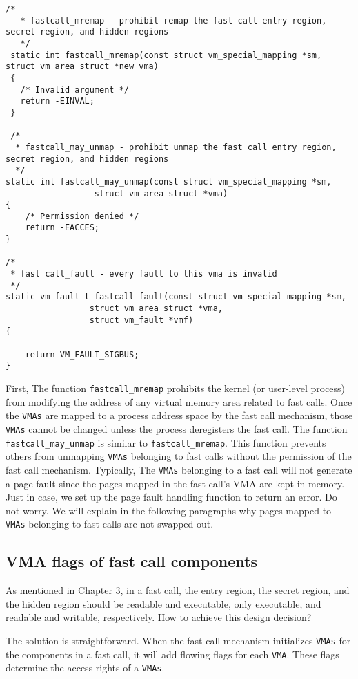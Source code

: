 \begin{lstlisting}[style=CStyle]
  /*
   * fastcall_mremap - prohibit remap the fast call entry region, secret region, and hidden regions
   */
 static int fastcall_mremap(const struct vm_special_mapping *sm, struct vm_area_struct *new_vma)
 {
   /* Invalid argument */
   return -EINVAL;
 }

 /*
  * fastcall_may_unmap - prohibit unmap the fast call entry region, secret region, and hidden regions
  */
static int fastcall_may_unmap(const struct vm_special_mapping *sm,
			      struct vm_area_struct *vma)
{
	/* Permission denied */
	return -EACCES;
}

/*
 * fast call_fault - every fault to this vma is invalid
 */
static vm_fault_t fastcall_fault(const struct vm_special_mapping *sm,
				 struct vm_area_struct *vma,
				 struct vm_fault *vmf)
{

	return VM_FAULT_SIGBUS;
}
\end{lstlisting}

First, The function \verb|fastcall_mremap| prohibits the kernel 
(or user-level process) from modifying the address of any virtual 
memory area related to fast calls. Once the \verb|VMAs| are mapped to a 
process address space by the fast call mechanism, those \verb|VMAs|  cannot 
be changed unless the process deregisters the fast call. The function 
\verb|fastcall_may_unmap| is similar to \verb|fastcall_mremap|. This function 
prevents others from unmapping \verb|VMAs| belonging to fast 
calls without the permission of the fast call mechanism. Typically, The \verb|VMAs|  belonging to a 
fast call will not generate a page fault since the pages mapped in the 
fast call's VMA are kept in memory. Just in case, we set up the page fault 
handling function to return an error. Do not worry. We will explain in 
the following paragraphs why pages mapped to \verb|VMAs| belonging to fast calls 
are not swapped out.

\subsection{VMA flags of fast call components}
As mentioned in Chapter 3, in a fast call, the entry region,
the secret region, and the hidden region should be readable and executable, 
only executable, and readable and writable, respectively. How to achieve this design decision?

The solution is straightforward. When the fast call mechanism initializes 
\verb|VMAs| for the components in a fast call, it will add flowing flags for 
each \verb|VMA|. These flags determine the access rights of a \verb|VMAs|.

